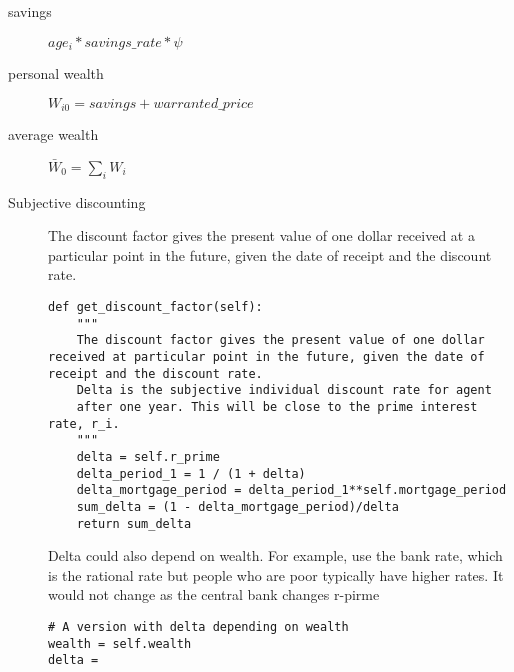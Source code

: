 \begin{description}
\item [savings] $age_i*savings\_rate*\psi$


\item[personal wealth] $W_{i0}= savings + warranted\_price $
\item[average wealth] $\bar W_{0}= \sum_i W_i$
\item[Subjective discounting] The discount factor gives the present value of one dollar received at a particular point in the future, given the date of receipt and the discount rate.
\begin{lstlisting}
def get_discount_factor(self):
    """
    The discount factor gives the present value of one dollar received at particular point in the future, given the date of receipt and the discount rate.
    Delta is the subjective individual discount rate for agent
    after one year. This will be close to the prime interest rate, r_i.
    """    
    delta = self.r_prime
    delta_period_1 = 1 / (1 + delta) 
    delta_mortgage_period = delta_period_1**self.mortgage_period
    sum_delta = (1 - delta_mortgage_period)/delta
    return sum_delta
\end{lstlisting}
Delta could also depend on wealth. For example,  use the bank rate, which is the rational rate but people who are poor typically have higher rates.  It would not change as the central bank changes r-pirme


\begin{lstlisting}
# A version with delta depending on wealth
wealth = self.wealth
delta =
\end{lstlisting}


\end{description}

